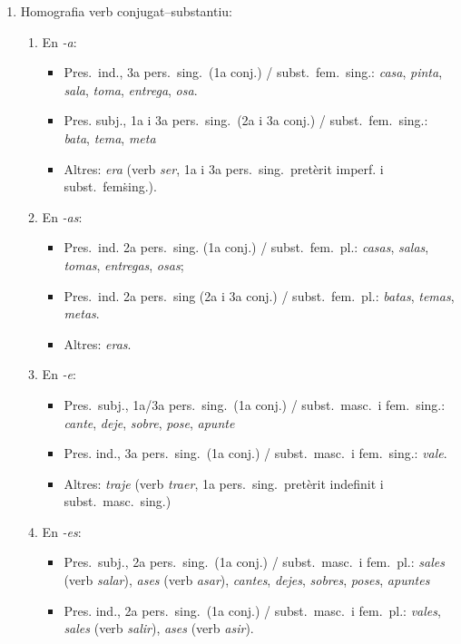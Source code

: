 \begin{enumerate}
\item Homografia verb conjugat--substantiu:
 \begin{enumerate}

   \item En \emph{-a}: 
   \begin{itemize}
   \item Pres.\ ind., 3a pers.\  sing.\ (1a conj.) / subst.\ fem.\ sing.: \emph{casa}, \emph{pinta},
   \emph{ sala}, \emph{toma}, \emph{entrega}, \emph{osa}.
   \item Pres. subj., 1a i 3a pers.\ sing.\ (2a i 3a conj.) / subst.\ fem.\ sing.:
       \emph{bata}, \emph{tema}, \emph{meta}
   \item Altres: \emph{era} (verb \emph{ser}, 1a i 3a pers.\ sing.\
     pretèrit imperf. i subst.\ fem\. sing.).
   \end{itemize} 

   \item En \emph{-as}:
   \begin{itemize}
   \item Pres.\ ind. 2a pers.\ sing. (1a conj.) / subst.\ fem.\ pl.:
       \emph{casas}, \emph{salas}, \emph{tomas}, \emph{entregas}, \emph{osas};
   \item Pres.\ ind. 2a pers.\ sing (2a i 3a  conj.) / subst.\ fem.\ pl.:
       \emph{batas}, \emph{temas}, \emph{metas}.
   \item Altres: \emph{eras}.
   \end{itemize}

   \item En \emph{-e}:
   \begin{itemize}
   \item Pres.\ subj., 1a/3a pers.\ sing.\ (1a conj.) / subst.\ masc.\  i fem.\
sing.:
       \emph{cante}, \emph{deje}, \emph{sobre}, \emph{pose}, \emph{apunte}
   \item Pres. ind., 3a pers.\ sing.\ (1a conj.) / subst.\ masc.\  i fem.\
sing.: \emph{vale}.
   \item Altres: \emph{traje} (verb \emph{traer}, 1a pers.\ sing.\
     pretèrit indefinit i subst.\ masc.\ sing.)
   \end{itemize}

   \item En \emph{-es}:
   \begin{itemize}
   \item Pres.\ subj., 2a pers.\ sing.\ (1a conj.) / subst.\ masc.\  i fem.\
pl.: \emph{sales} (verb \emph{salar}), \emph{ases} (verb \emph{asar}), 
     \emph{cantes}, \emph{dejes}, \emph{sobres}, \emph{poses}, \emph{apuntes}
   \item Pres. ind., 2a pers.\ sing.\ (1a conj.) / subst.\ masc.\  i fem.\
pl.: \emph{vales}, \emph{sales} (verb \emph{salir}), \emph{ases} (verb
\emph{asir}).
   \end{itemize}
 


\end{enumerate}
\end{enumerate}
